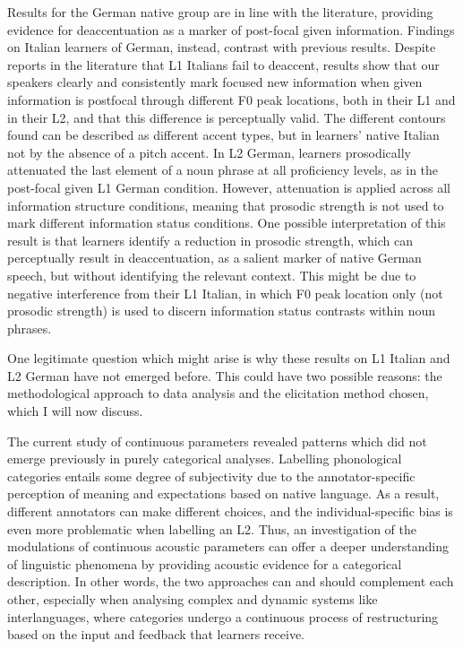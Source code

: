 \begin{styleStandard}
Results for the German native group are in line with the literature, providing evidence for deaccentuation as a marker of post-focal given information. Findings on Italian learners of German, instead, contrast with previous results. Despite reports in the literature that L1 Italians fail to deaccent, results show that our speakers clearly and consistently mark focused new information when given information is postfocal through different F0 peak locations, both in their L1 and in their L2, and that this difference is perceptually valid. The different contours found can be described as different accent types, but in learners’ native Italian not by the absence of a pitch accent. In L2 German, learners prosodically attenuated the last element of a noun phrase at all proficiency levels, as in the post-focal given L1 German condition. However, attenuation is applied across all information structure conditions, meaning that prosodic strength is not used to mark different information status conditions. One possible interpretation of this result is that learners identify a reduction in prosodic strength, which can perceptually result in deaccentuation, as a salient marker of native German speech, but without identifying the relevant context. This might be due to negative interference from their L1 Italian, in which F0 peak location only (not prosodic strength) is used to discern information status contrasts within noun phrases.
\end{styleStandard}

\begin{styleStandard}
One legitimate question which might arise is why these results on L1 Italian and L2 German have not emerged before. This could have two possible reasons: the methodological approach to data analysis and the elicitation method chosen, which I will now discuss.
\end{styleStandard}

\begin{styleStandard}
The current study of continuous parameters revealed patterns which did not emerge previously in purely categorical analyses. Labelling phonological categories entails some degree of subjectivity due to the annotator-specific perception of meaning and expectations based on native language. As a result, different annotators can make different choices, and the individual-specific bias is even more problematic when labelling an L2. Thus, an investigation of the modulations of continuous acoustic parameters can offer a deeper understanding of linguistic phenomena by providing acoustic evidence for a categorical description. In other words, the two approaches can and should complement each other, especially when analysing complex and dynamic systems like interlanguages, where categories undergo a continuous process of restructuring based on the input and feedback that learners receive.
\end{styleStandard}

